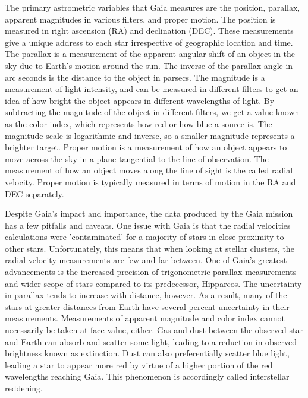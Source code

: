 \documentclass[aps,prb,twocolumn,groupedaddress,nofootinbib,floatfix]{revtex4-1}
\begin{document}
The primary astrometric  variables that Gaia measures are the position, parallax, apparent magnitudes in various filters, and proper motion. The position is measured in right ascension (RA) and declination (DEC). These measurements give a unique address to each star irrespective of geographic location and time. The parallax is a measurement of the apparent angular shift of an object in the sky due to Earth's motion around the sun. The inverse of the parallax angle in arc seconds is the distance to the object in parsecs. The magnitude is a measurement of light intensity, and can be measured in different filters to get an idea of how bright the object appears in different wavelengths of light. By subtracting the magnitude of the object in different filters, we get a value known as the color index, which represents how red or how blue a source is. The magnitude scale is logarithmic and inverse, so a smaller magnitude represents a brighter target. Proper motion is a measurement of how an object appears to move across the sky in a plane tangential to the line of observation. The measurement of how an object moves along the line of sight is the called radial velocity. Proper motion is typically measured in terms of motion in the RA and DEC separately.

Despite Gaia's impact and importance, the data produced by the Gaia mission has a few pitfalls and caveats. One issue with Gaia is that the radial velocities calculations were 'contaminated' for a majority of stars in close proximity to other stars. Unfortunately, this means that when looking at stellar clusters, the radial velocity measurements are few and far between. One of Gaia's greatest advancements is the increased precision of trigonometric parallax measurements and wider scope of stars compared to its predecessor, Hipparcos. The uncertainty in parallax tends to increase with distance, however. As a result, many of the stars at greater distances from Earth have several percent uncertainty in their measurements. Measurements of apparent magnitude and color index cannot necessarily be taken at face value, either. Gas and dust between the observed star and Earth can absorb and scatter some light, leading to a reduction in observed brightness known as extinction. Dust can also preferentially scatter blue light, leading a star to appear more red by virtue of a higher portion of the red wavelengths reaching Gaia. This phenomenon is accordingly called interstellar reddening.
\end{document}
